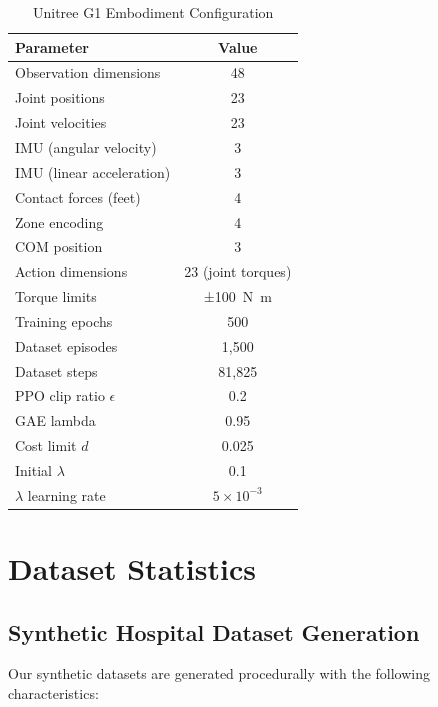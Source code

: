 \documentclass[conference]{IEEEtran}
\begin{document}
\begin{table}[h]
\centering
\caption{Unitree G1 Embodiment Configuration}
\begin{tabular}{@{}lc@{}}
\toprule
\textbf{Parameter} & \textbf{Value} \\
\midrule
Observation dimensions & 48 \\
\quad Joint positions & 23 \\
\quad Joint velocities & 23 \\
\quad IMU (angular velocity) & 3 \\
\quad IMU (linear acceleration) & 3 \\
\quad Contact forces (feet) & 4 \\
\quad Zone encoding & 4 \\
\quad COM position & 3 \\
Action dimensions & 23 (joint torques) \\
Torque limits & ±\SI{100}{\newton\metre} \\
Training epochs & 500 \\
Dataset episodes & 1{,}500 \\
Dataset steps & 81{,}825 \\
PPO clip ratio $\epsilon$ & 0.2 \\
GAE lambda & 0.95 \\
Cost limit $d$ & 0.025 \\
Initial $\lambda$ & 0.1 \\
$\lambda$ learning rate & $5 \times 10^{-3}$ \\
\bottomrule
\end{tabular}
\end{table}

\section{Dataset Statistics}
\label{sec:supp_data}

\subsection{Synthetic Hospital Dataset Generation}

Our synthetic datasets are generated procedurally with the following characteristics:
\end{document}
